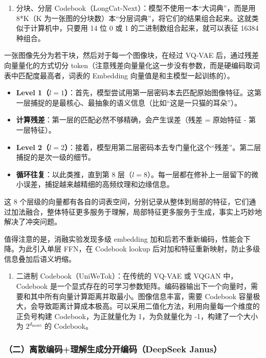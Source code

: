 \begin{enumerate}
\def\labelenumi{\arabic{enumi}.}
\tightlist
\item
  分块、分层 Codebook（LongCat-Next）：模型不使用一本``大词典''，而是用 8*K（K 为一张图的分块数）本``分层词典''，将它们的结果组合起来。这就类似于计算机中，只要用 14 位 0 或 1 的二进制数组合起来，就可以表征 16384 种组合。
\end{enumerate}

一张图像先分为若干块，然后对于每一个图像块，在经过 VQ-VAE 后，通过残差向量量化的方式切分 token（注意残差向量量化这一步没有参数，而是硬编码取词表中匹配度最高者，词表的 Embedding 向量值是和主模型一起训练的）。

\begin{itemize}
\tightlist
\item
  \textbf{Level 1（\(l=1\)）}：首先，模型尝试用第一层密码本去匹配原始图像特征。这第一层捕捉的是最核心、最抽象的语义信息（比如``这是一只猫的耳朵''）。
\item
  \textbf{计算残差}：第一层的匹配必然不够精确，会产生误差（残差 = 原始特征 - 第一层特征）。
\item
  \textbf{Level 2（\(l=2\)）}：接着，模型用第二层密码本去专门量化这个``残差''。第二层捕捉的是次一级的细节。
\item
  \textbf{循环往复}：以此类推，直到第 8 层（\(l=8\)）。每一层都在修补上一层留下的微小误差，捕捉越来越精细的高频纹理和边缘信息。
\end{itemize}

这 8 个层级的向量都有各自的词表空间，分别记录从整体到局部的特征，它们通过加法融合，整体特征更多服务于理解，局部特征更多服务于生成，事实上巧妙地解决了冲突问题。

值得注意的是，消融实验发现多级 embedding 加和后若不重新编码，性能会下降。为此引入单层 FFN，在 Codebook lookup 后对加和特征重新映射，防止多级信息叠加后语义坍缩。

\begin{enumerate}
\def\labelenumi{\arabic{enumi}.}
\setcounter{enumi}{1}
\tightlist
\item
  二进制 Codebook（UniWeTok）：在传统的 VQ-VAE 或 VQGAN 中，Codebook 是一个显式存在的可学习参数矩阵。编码器输出下一个向量时，需要和其中所有向量计算距离并取最小。图像信息丰富，需要 Codebook 容量极大，会导致距离计算成本极高。可以采用二值化方法，利用向量每一个维度的正负号构建 Codebook，为正就量化为 1，为负就量化为 -1，构建了一个大小为 \(2^{d_{\mathrm{model}}}\) 的 Codebook。
\end{enumerate}

\hypertarget{ux4e8cux79bbux6563ux7f16ux7801ux7406ux89e3ux751fux6210ux5206ux5f00ux7f16ux7801deepseek-janus}{%
\subsubsection{（二）离散编码+理解生成分开编码（DeepSeek Janus）}\label{ux4e8cux79bbux6563ux7f16ux7801ux7406ux89e3ux751fux6210ux5206ux5f00ux7f16ux7801deepseek-janus}}

